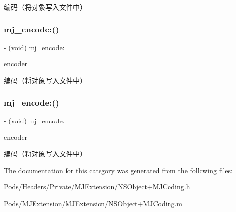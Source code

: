 编码（将对象写入文件中） \mbox{\label{category_n_s_object_07_m_j_coding_08_a985b5ac8485573cbe6cedb1a41127e38}} 
\subsubsection{\texorpdfstring{mj\+\_\+encode\+:()}{mj\_encode:()}\hspace{0.1cm}{\footnotesize\ttfamily [2/3]}}
{\footnotesize\ttfamily -\/ (void) mj\+\_\+encode\+: \begin{DoxyParamCaption}\item[{(N\+S\+Coder $\ast$)}]{encoder }\end{DoxyParamCaption}}

编码（将对象写入文件中） \mbox{\label{category_n_s_object_07_m_j_coding_08_a985b5ac8485573cbe6cedb1a41127e38}} 
\subsubsection{\texorpdfstring{mj\+\_\+encode\+:()}{mj\_encode:()}\hspace{0.1cm}{\footnotesize\ttfamily [3/3]}}
{\footnotesize\ttfamily -\/ (void) mj\+\_\+encode\+: \begin{DoxyParamCaption}\item[{(N\+S\+Coder $\ast$)}]{encoder }\end{DoxyParamCaption}}

编码（将对象写入文件中） 

The documentation for this category was generated from the following files\+:\begin{DoxyCompactItemize}
\item 
Pods/\+Headers/\+Private/\+M\+J\+Extension/N\+S\+Object+\+M\+J\+Coding.\+h\item 
Pods/\+M\+J\+Extension/\+M\+J\+Extension/N\+S\+Object+\+M\+J\+Coding.\+m\end{DoxyCompactItemize}
